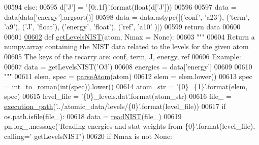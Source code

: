 \begin{DoxyCode}
00594         \textcolor{keywordflow}{else}:
00595             d[\textcolor{stringliteral}{'J'}] = \textcolor{stringliteral}{'\{0:.1f\}'}.format(float(d[\textcolor{stringliteral}{'J'}]))
00596            
00597     data = data[data[\textcolor{stringliteral}{'energy'}].argsort()]
00598     data = data.astype([(\textcolor{stringliteral}{'conf'}, \textcolor{stringliteral}{'a23'}), (\textcolor{stringliteral}{'term'}, \textcolor{stringliteral}{'a9'}), (\textcolor{stringliteral}{'J'}, \textcolor{stringliteral}{'float'}), (\textcolor{stringliteral}{'energy'}, \textcolor{stringliteral}{'float'}), (\textcolor{stringliteral}{'ref'}, \textcolor{stringliteral}{'a10'}
      )])
00599     \textcolor{keywordflow}{return} data
00600 
00601 
\hypertarget{manage__atomic__data_8py_source_l00602}{}\hyperlink{namespacepyneb_1_1utils_1_1manage__atomic__data_ad09376e8676854d44680ae14210b5589}{00602} \textcolor{keyword}{def }\hyperlink{namespacepyneb_1_1utils_1_1manage__atomic__data_ad09376e8676854d44680ae14210b5589}{getLevelsNIST}(atom, Nmax = None):
00603     \textcolor{stringliteral}{"""}
00604 \textcolor{stringliteral}{    Return a numpy.array containing the NIST data related to the levels for the given atom}
00605 \textcolor{stringliteral}{    The keys of the recarry are: conf, term, J, energy, ref}
00606 \textcolor{stringliteral}{    Example:}
00607 \textcolor{stringliteral}{        data = getLevelsNIST('O3')}
00608 \textcolor{stringliteral}{        energies = data['energy']}
00609 \textcolor{stringliteral}{        }
00610 \textcolor{stringliteral}{    """}
00611     elem, spec = \hyperlink{namespacepyneb_1_1utils_1_1misc_a8c069186002a3e73dd474958e35034d5}{parseAtom}(atom)
00612     elem = elem.lower()
00613     spec = \hyperlink{namespacepyneb_1_1utils_1_1misc_aec4e973d4cb9299f749ef190ea636a06}{int\_to\_roman}(int(spec)).lower()
00614     atom\_str = \textcolor{stringliteral}{'\{0\}\_\{1\}'}.format(elem, spec)
00615     level\_file = \textcolor{stringliteral}{'\{0\}\_levels.dat'}.format(atom\_str)
00616     file\_ = \hyperlink{namespacepyneb_1_1utils_1_1misc_a0e9572755930aabb03c6b0e5d66b8356}{execution\_path}(\textcolor{stringliteral}{'../atomic\_data/levels/\{0\}'}.format(level\_file))
00617     \textcolor{keywordflow}{if} os.path.isfile(file\_):
00618         data = \hyperlink{namespacepyneb_1_1utils_1_1manage__atomic__data_ab843a6f51ebb888e83a849835e49a885}{readNIST}(file\_)
00619         pn.log\_.message(\textcolor{stringliteral}{'Reading energies and stat weights from \{0\}'}.format(level\_file), calling=\textcolor{stringliteral}{'
      getLevelsNIST'})
00620         \textcolor{keywordflow}{if} Nmax \textcolor{keywordflow}{is} \textcolor{keywordflow}{not} \textcolor{keywordtype}{None}:

\end{DoxyCode}
